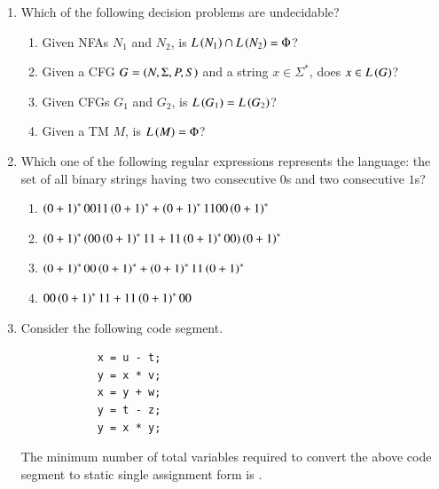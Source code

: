 \documentclass[journal,12pt,onecolumn]{IEEEtran}
\theoremstyle{remark}
\begin{document}
\begin{enumerate}
\begin{enumerate}
		\end{enumerate}
		
		\item Which of the following decision problems are undecidable?
		\begin{enumerate}
			\item Given NFAs $N_1$ and $N_2$, is $L\left(N_1\right) \cap L\left(N_2\right) = \Phi$?
			\item Given a CFG $G = \left(N, \Sigma, P, S\right)$ and a string $x \in \Sigma^*$, does $x \in L\left(G\right)$?
			\item Given CFGs $G_1$ and $G_2$, is $L\left(G_1\right) = L\left(G_2\right)$?
			\item Given a TM $M$, is $L\left(M\right) = \Phi$?
		\end{enumerate}
		
		\hfill{}
		\begin{enumerate}
		\end{enumerate}
		
		\item Which one of the following regular expressions represents the language: the set of all binary strings having two consecutive $0$s and two consecutive $1$s?
		
		\hfill{\brak{\text{GATE CS 2016}}}
		\begin{enumerate}
			\item $\left(0 + 1\right)^* 0011 \left(0 + 1\right)^* + \left(0 + 1\right)^* 1100 \left(0 + 1\right)^*$
			\item $\left(0 + 1\right)^* \left(00\left(0 + 1\right)^* 11 + 11\left(0 + 1\right)^* 00\right) \left(0 + 1\right)^*$
			\item $\left(0 + 1\right)^* 00 \left(0 + 1\right)^* + \left(0 + 1\right)^* 11 \left(0 + 1\right)^*$
			\item $00\left(0 + 1\right)^* 11 + 11\left(0 + 1\right)^* 00$
		\end{enumerate}
		
		\item Consider the following code segment.
		\begin{verbatim}
			x = u - t;
			y = x * v;
			x = y + w;
			y = t - z;
			y = x * y;
		\end{verbatim}
		The minimum number of total variables required to convert the above code segment to static single assignment form is \underline{\hspace{2cm}}.
		

\end{enumerate}
\end{document}
